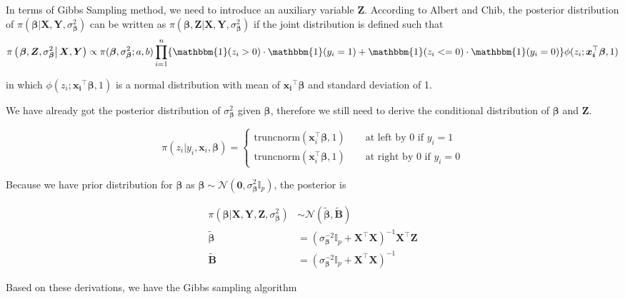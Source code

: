 \documentclass[12pt]{article}
\begin{document}
In terms of Gibbs Sampling method, we need to introduce an auxiliary variable $\bm{Z}$. According to Albert and Chib\cite{gibbs}, the posterior distribution of $\pi\left(\left.\bm{\beta}\right\vert \bm{X}, \bm{Y}, \sigma_{\bm{\beta}}^2 \right)$ can be written as $\pi\left(\left.\bm{\beta}, \bm{Z}\right\vert \bm{X}, \bm{Y}, \sigma_{\bm{\beta}}^2\right)$ if the joint distribution is defined such that
\[ \pi\left(\left.\bm{\beta}, \bm{Z}, \sigma_{\bm{\beta}}^2\right\vert \bm{X}, \bm{Y}\right) \propto \pi(\bm{\beta}, \sigma^2_{\bm{\beta}}; a,b) \prod_{i=1}^{n} \{\mathbbm{1}(z_i > 0)\cdot \mathbbm{1}(y_i = 1) +\mathbbm{1}(z_i <= 0)\cdot \mathbbm{1}(y_i = 0) \} \phi(z_i; \bm{x_i}^\top \bm{\beta}, 1) \]

in which $\phi(z_i; \bm{x_i}^\top \bm{\beta}, 1)$ is a normal distribution with mean of $\bm{x_i}^\top \bm{\beta}$ and standard deviation of 1.

We have already got the posterior distribution of $\sigma_{\bm{\beta}}^2$ given $\bm{\beta}$, therefore we still need to derive the conditional distribution of $\bm{\beta}$ and $\bm{Z}$.

\[  \pi\left(\left.z_i\right\vert y_i, \bm{x}_i, \bm{\beta} \right) = \begin{cases}
	\text{truncnorm}(\bm{x}_i^\top \bm{\beta}, 1)\qquad \text{at left by 0 if } y_i=1\\
	\text{truncnorm}(\bm{x}_i^\top \bm{\beta}, 1)\qquad \text{at right by 0 if } y_i=0
\end{cases}\]

Because we have prior distribution for $\bm{\beta}$ as $\bm{\beta} \sim \mathcal{N}(\bm{0}, \sigma^2_{\bm{\beta}} \mathbb{I}_p)$, the posterior is  

\begin{align*}
	\pi \left(\left.\bm{\beta}\right\vert \bm{X}, \bm{Y}, \bm{Z}, \sigma^2_{\bm{\beta}} \right) &\sim \mathcal{N}(\tilde{\bm{\beta}}, \tilde{\bm{B}})\\
	\tilde{\bm{\beta}} &= \left(\sigma^{-2}_{\bm{\beta}} \mathbb{I}_p +\bm{X}^\top \bm{X}\right)^{-1}\bm{X}^\top \bm{Z}\\
	\tilde{\bm{B}} &= \left(\sigma^{-2}_{\bm{\beta}} \mathbb{I}_p +\bm{X}^\top \bm{X}\right)^{-1}
\end{align*}

Based on these derivations, we have the Gibbs sampling algorithm
\end{document}
